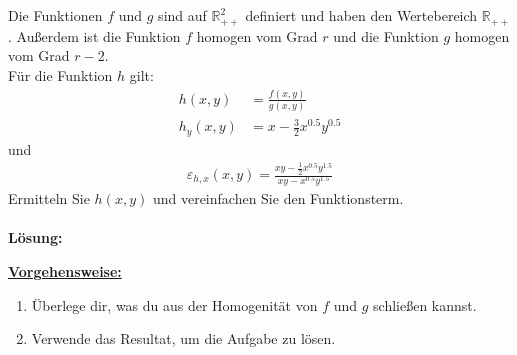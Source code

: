\newpage


\subsection*{}
Die Funktionen $ f $ und $ g $ sind auf $ \mathbb{R}^2_{++} $ definiert und haben den Wertebereich $ \mathbb{R}_{++} $.
Außerdem ist die Funktion $ f $ homogen vom Grad $ r $ und die Funktion $ g $ homogen vom Grad $ r -2 $.\\
Für die Funktion $ h $ gilt:
\begin{align*}
h(x,y) &= \frac{f(x,y)}{g(x,y)}\\
h_y(x,y) &= x  - \frac{3}{2} x^{0.5} y^{0.5}
\end{align*}
und
\begin{align*}
\varepsilon_{h,x}(x,y)
= 
\frac{xy - \frac{1}{2}x^{0.5} y^{1.5}}{xy - x^{0.5} y^{1.5}}
\end{align*}
Ermitteln Sie $ h(x,y) $ und vereinfachen Sie den Funktionsterm.
\\
\\
\textbf{Lösung:}
\begin{mdframed}
\underline{\textbf{Vorgehensweise:}}
\renewcommand{\labelenumi}{\theenumi.}
\begin{enumerate}
\item Überlege dir, was du aus der Homogenität von $ f $ und $ g $ schließen kannst.
\item Verwende das Resultat, um die Aufgabe zu lösen.
\end{enumerate}
\end{mdframed}


